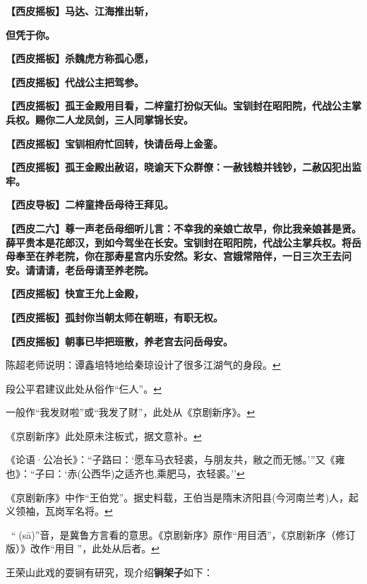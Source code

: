 \textbf{【西皮摇板】马达、江海推出斩，}

\textbf{但凭于你。}

\textbf{【西皮摇板】杀魏虎方称孤心愿，}

\textbf{【西皮摇板】代战公主把驾参。}

\textbf{【西皮摇板】孤王金殿用目看，二梓童打扮似天仙。宝钏封在昭阳院，代战公主掌兵权。赐你二人龙凤剑，三人同掌锦长安。}

\textbf{【西皮摇板】宝钏相府忙回转，快请岳母上金銮。}

\textbf{【西皮摇板】孤王金殿出赦诏，晓谕天下众群僚：一赦钱粮并钱钞，二赦囚犯出监牢。}

\textbf{【西皮导板】二梓童搀岳母待王拜见。}

\textbf{【西皮二六】尊一声老岳母细听儿言：不幸我的亲娘亡故早，你比我亲娘甚是贤。薛平贵本是花郎汉，到如今驾坐在长安。宝钏封在昭阳院，代战公主掌兵权。将岳母奉至在养老院，你在那寿星宫内乐安然。彩女、宫娥常陪伴，一日三次王去问安。请请请，老岳母请至养老院。}

\textbf{【西皮摇板】快宣王允上金殿，}

\textbf{【西皮摇板】孤封你当朝太师在朝班，有职无权。}

\textbf{【西皮摇板】朝事已毕把班散，养老宫去问岳母安。}


\item
  \leavevmode\hypertarget{fn307}{}%
  陈超老师说明：谭鑫培特地给秦琼设计了很多江湖气的身段。\protect\hyperlink{fnref307}{↩}
\item
  \leavevmode\hypertarget{fn308}{}%
  段公平君建议此处从俗作``仨人''。\protect\hyperlink{fnref308}{↩}
\item
  \leavevmode\hypertarget{fn309}{}%
  一般作``我发财啦''或``我发了财''，此处从《京剧新序》。\protect\hyperlink{fnref309}{↩}
\item
  \leavevmode\hypertarget{fn310}{}%
  《京剧新序》此处原未注板式，据文意补。\protect\hyperlink{fnref310}{↩}
\item
  \leavevmode\hypertarget{fn311}{}%
  《论语·公冶长》：``子路曰：`愿车马衣轻裘，与朋友共，敝之而无憾。'''又《雍也》：``子曰：`赤(公西华)之适齐也,乘肥马，衣轻裘。''\protect\hyperlink{fnref311}{↩}
\item
  \leavevmode\hypertarget{fn312}{}%
  《京剧新序》中作``王伯党''。据史料载，王伯当是隋末济阳县(今河南兰考)人，起义领袖，瓦岗军名将。\protect\hyperlink{fnref312}{↩}
\item
  \leavevmode\hypertarget{fn313}{}%
  𥋌念``撒(sā)''音，是冀鲁方言看的意思。《京剧新序》原作``用目洒''，《京剧新序（修订版）》改作``用目𥋌''，此处从后者。\protect\hyperlink{fnref313}{↩}
\item
  \leavevmode\hypertarget{fn314}{}%
  王荣山此戏的耍锏有研究，现介绍\textbf{锏架子}如下：

